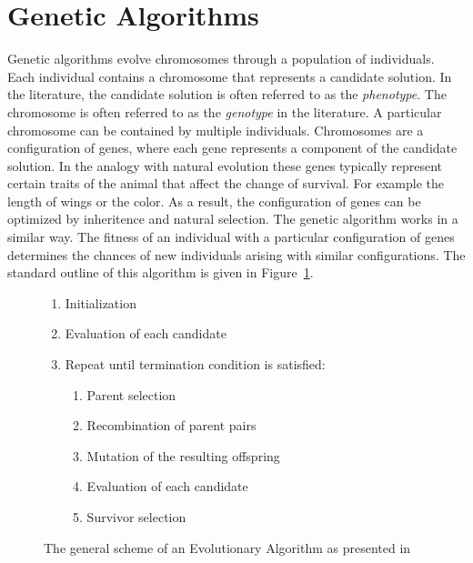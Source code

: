 \section{Genetic Algorithms}
\label{sec:background_genetic_algorithms}
Genetic algorithms \citep{Holland1992} evolve chromosomes through a population of individuals. Each individual contains a
chromosome that represents a candidate solution. In the literature, the
candidate solution is often referred to as the \emph{phenotype}. The chromosome
is often referred to as the \emph{genotype} in the literature. A particular
chromosome can be contained by multiple individuals. Chromosomes are a
configuration of genes, where each gene represents a component of the candidate
solution. In the analogy with natural evolution these genes typically represent
certain traits of the animal that affect the change of survival. For example
the length of wings or the color. As a result, the configuration of genes can be
optimized by inheritence and natural selection. The genetic algorithm works in a
similar way. The fitness of an individual with a particular configuration
of genes determines the chances of new individuals arising with similar
configurations. The standard outline of this algorithm is given in
Figure~\ref{alg:ea_scheme}.
\label{approach_genetic_algorithm}
\begin{figure}[ht!]
	\begin{framed}
		\begin{enumerate}
			\item Initialization
			\item Evaluation of each candidate
			\item Repeat until termination condition is satisfied:
				\begin{enumerate}
					\item Parent selection
					\item Recombination of parent pairs
					\item Mutation of the resulting offspring
					\item Evaluation of each candidate
					\item Survivor selection
				\end{enumerate}
		\end{enumerate}
	\end{framed}
	\caption[The evolutionary algorithm]{The general scheme of an
		Evolutionary Algorithm as presented in \citep{Eiben2007}}
	\label{alg:ea_scheme}
\end{figure}
